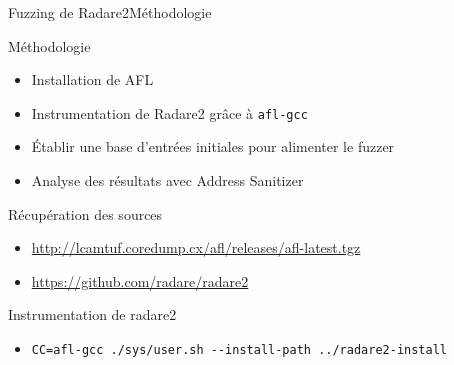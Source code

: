 \begin{frame}[fragile]{Fuzzing de Radare2}{Méthodologie}
  \begin{block}{Méthodologie}
    \begin{itemize}
    \item{Installation de AFL}
    \item{Instrumentation de Radare2 grâce à \lstinline{afl-gcc}}
    \item{Établir une base d'entrées initiales pour alimenter le fuzzer}
    \item{Analyse des résultats avec Address Sanitizer}
    \end{itemize}
  \end{block}

  \pause

  \begin{exampleblock}{Récupération des sources}
    \begin{itemize}
    \item{\url{http://lcamtuf.coredump.cx/afl/releases/afl-latest.tgz}}
    \item{\url{https://github.com/radare/radare2}}
    \end{itemize}
  \end{exampleblock}

  \pause
  \vfill

  \begin{exampleblock}{Instrumentation de radare2}
    \begin{itemize}
    \item \lstinline{CC=afl-gcc ./sys/user.sh --install-path ../radare2-install}
    \end{itemize}
  \end{exampleblock}

\end{frame}


